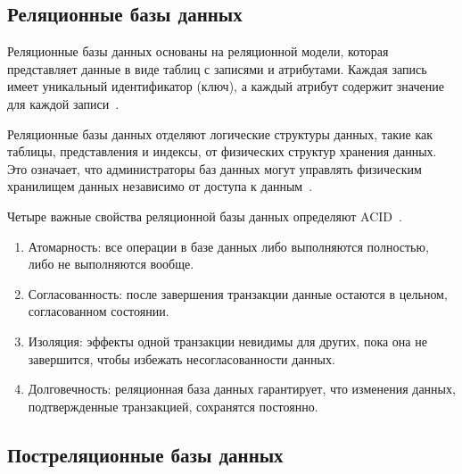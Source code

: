 \subsection{Реляционные базы данных}

Реляционные базы данных основаны на реляционной модели, которая представляет данные в виде таблиц с записями и атрибутами. Каждая запись имеет уникальный идентификатор (ключ), а каждый атрибут содержит значение для каждой записи~\cite{rel2}.

Реляционные базы данных отделяют логические структуры данных, такие как таблицы, представления и индексы, от физических структур хранения данных. Это означает, что администраторы баз данных могут управлять физическим хранилищем данных независимо от доступа к данным~\cite{rel}. 

Четыре важные свойства реляционной базы данных определяют ACID~\cite{rel}.
\begin{enumerate}[label=\arabic*)]
	\item Атомарность: все операции в базе данных либо выполняются полностью, либо не выполняются вообще.
	\item Согласованность: после завершения транзакции данные остаются в цельном, согласованном состоянии.
	\item Изоляция: эффекты одной транзакции невидимы для других, пока она не завершится, чтобы избежать несогласованности данных.
	\item Долговечность: реляционная база данных гарантирует, что изменения данных, подтвержденные транзакцией, сохранятся постоянно.
\end{enumerate}

\subsection{Постреляционные базы данных}

